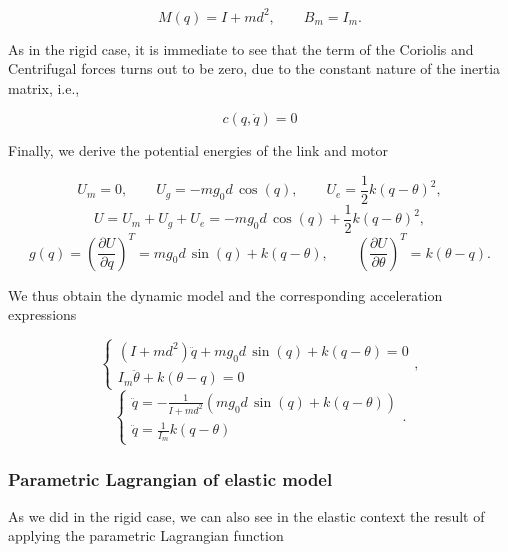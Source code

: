 \documentclass[a4paper]{article}
\begin{document}
\begin{equation}
    \nonumber
    M(q) = I + md^2, \qquad B_m = I_m.
\end{equation}

As in the rigid case, it is immediate to see that the term of the Coriolis and Centrifugal forces turns out to be zero, due to the constant nature of the inertia matrix, i.e.,

\begin{equation}
    \nonumber
    c(q,\dot{q}) = 0
\end{equation}

Finally, we derive the potential energies of the link and motor

\begin{equation}
    \nonumber
    U_m = 0, \qquad U_g = -mg_0d\, \cos(q), \qquad U_e = \frac{1}{2} k(q-\theta)^2,
\end{equation}
\begin{equation}
    \nonumber
    U = U_m + U_g + U_e = -mg_0d\, \cos(q) + \frac{1}{2}k(q-\theta)^2,
\end{equation}
\begin{equation}
    \nonumber
    g(q) = \left(\frac{\partial U}{\partial q}\right)^T = mg_0d\, \sin(q) +k(q-\theta),\qquad \left(\frac{\partial U}{\partial \theta}\right)^T = k(\theta - q).
\end{equation}

We thus obtain the dynamic model and the corresponding acceleration expressions
\begin{center}
\begin{equation}
    \nonumber
    \begin{cases}
        (I+md^2)\ddot{q}+mg_0d\, \sin(q) +k(q-\theta)=0\\
        I_m\ddot{\theta}+k(\theta-q)=0
    \end{cases},
\end{equation}
\begin{equation}
    \label{eq:el_mod9}
    \begin{cases}
        \ddot{q}=-\frac{1}{I+md^2}(mg_0d\, \sin(q)+k(q-\theta))\\
        \ddot{q}=\frac{1}{I_m}k(q-\theta)
    \end{cases}.
\end{equation}
\end{center}

\subsubsection{Parametric Lagrangian of elastic model}
As we did in the rigid case, we can also see in the elastic context the result of applying the parametric Lagrangian function
\end{document}
